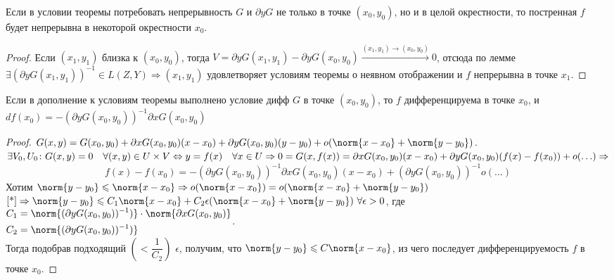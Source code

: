 \begin{theorem}
    Если в условии теоремы  потребовать непрерывность $G$ и $\partial y G$ не только в точке $(x_0, y_0)$, но и в целой окрестности, то постренная $f$ будет непрерывна в некоторой окрестности $x_0$.
\end{theorem}
\begin{proof}
    Если $(x_1, y_1)$ близка к $(x_0, y_0)$, тогда $V = \partial y G(x_1, y_1) - \partial y G(x_0, y_0) \stackrel{(x_1, y_1) \to (x_0, y_0)}{\longrightarrow} 0$, отсюда по лемме $\exists (\partial y G(x_1, y_1))^{-1} \in L(Z, Y) \Rightarrow (x_1, y_1)$ удовлетворяет условиям теоремы о неявном отображении и $f$ непрерывна в точке $x_1$.
\end{proof}

\begin{theorem}
    Если в дополнение к условиям теоремы  выполнено условие дифф $G$ в точке $(x_0, y_0)$, то $f$ дифференцируема в точке $x_0$, и $d f(x_0) = - (\partial y G(x_0, y_0))^{-1} \partial x G(x_0, y_0)$
\end{theorem}
\begin{proof}
    $G(x,y) = G(x_0, y_0) + \partial x G(x_0, y_0) (x - x_0) + \partial y G(x_0, y_0) (y - y_0) + o (\norm{x - x_0} + \norm{y - y_0})$.\\
    $\exists V_0, U_0 \colon G(x, y) = 0 \quad \forall (x, y) \in U \times V \Leftrightarrow y = f(x) \quad \forall x \in U \Rightarrow \\ 0 = G(x, f(x)) = \partial x G(x_0, y_0) (x - x_0) + \partial y G(x_0, y_0) (f(x) - f(x_0)) + o(\ldots) \Rightarrow$
    \begin{equation}
        \label{*}
        f(x) - f(x_0) = - (\partial y G(x_0, y_0))^{-1} \partial x G(x_0, y_0) (x - x_0) + (\partial y G(x_0, y_0))^{-1}o(\ldots)
    \end{equation}
    Хотим $\norm{y - y_0} \leqslant \norm{x - x_0} \Rightarrow o(\norm{x - x_0}) = o(\norm{x - x_0} + \norm{y - y_0})$\\
    $\ref{*} \Rightarrow \norm{y - y_0} \leqslant C_1 \norm{x - x_0} + C_2\epsilon (\norm{x - x_0} + \norm{y - y_0}) \ \forall \epsilon > 0$, где\\
    $\begin{aligned}
    C_1 &= \norm{(\partial y G(x_0, y_0))^{-1})} \cdot \norm{\partial x G(x_0, y_0)} \\
    C_2 &= \norm{(\partial y G(x_0, y_0))^{-1})}
    \end{aligned}$.\\
    Тогда подобрав подходящий $\left(< \dfrac{1}{C_2}\right)$ $\epsilon$, получим, что $\norm{y - y_0} \leqslant C \norm{x - x_0}$, из чего последует дифференцируемость $f$ в точке $x_0$.
\end{proof}

